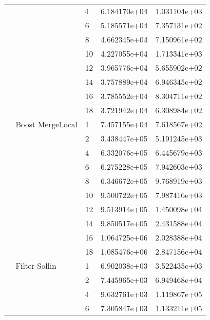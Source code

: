 \begin{tabular}{lllrr}
                      &                     & 4  &  6.184170e+04 &  1.031104e+03 \\
                      &                     & 6  &  5.185571e+04 &  7.357131e+02 \\
                      &                     & 8  &  4.662345e+04 &  7.150961e+02 \\
                      &                     & 10 &  4.227055e+04 &  1.713341e+03 \\
                      &                     & 12 &  3.965776e+04 &  5.655902e+02 \\
                      &                     & 14 &  3.757889e+04 &  6.946345e+02 \\
                      &                     & 16 &  3.785552e+04 &  8.304711e+02 \\
                      &                     & 18 &  3.721942e+04 &  6.308984e+02 \\
                      & Boost MergeLocal & 1  &  7.457155e+04 &  7.618567e+02 \\
                      &                     & 2  &  3.438447e+05 &  5.191245e+03 \\
                      &                     & 4  &  6.332076e+05 &  6.445679e+03 \\
                      &                     & 6  &  6.275228e+05 &  7.942603e+03 \\
                      &                     & 8  &  6.346672e+05 &  9.768919e+03 \\
                      &                     & 10 &  9.500722e+05 &  7.987416e+03 \\
                      &                     & 12 &  9.513914e+05 &  1.450098e+04 \\
                      &                     & 14 &  9.850517e+05 &  2.431588e+04 \\
                      &                     & 16 &  1.064725e+06 &  2.028388e+04 \\
                      &                     & 18 &  1.085476e+06 &  2.847156e+04 \\
                      & Filter Sollin & 1  &  6.902038e+03 &  3.522435e+03 \\
                      &                     & 2  &  7.445965e+03 &  6.949468e+04 \\
                      &                     & 4  &  9.632761e+03 &  1.119867e+05 \\
                      &                     & 6  &  7.305847e+03 &  1.133211e+05 \\

\end{tabular}
